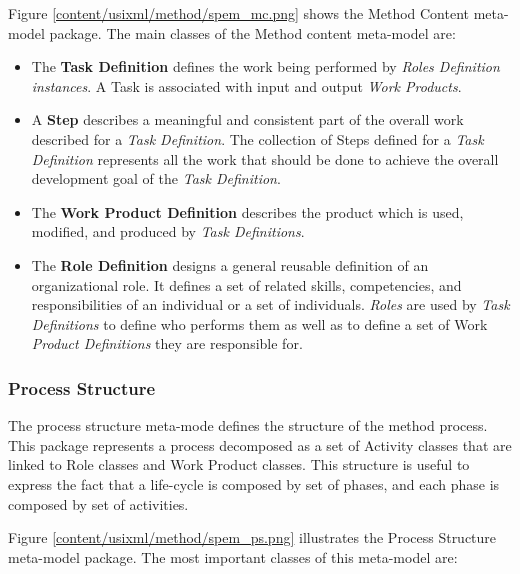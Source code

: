 Figure \ref{content/usixml/method/spem_mc.png} shows the Method Content meta-model package. The main classes of the Method content meta-model are:
\begin{itemize}
\item The \textbf{Task Definition} defines the work being performed by \textit{Roles Definition instances}. A Task is associated with input and output \textit{Work Products}.

\item A \textbf{Step} describes a meaningful and consistent part of the overall work described for
a \textit{Task Definition}. The collection of Steps defined for a \textit{Task Definition} represents all the work that should be done to achieve the overall development goal of the \textit{Task Definition}.

\item The \textbf{Work Product Definition} describes the product which is used, modified, and
produced by \textit{Task Definitions}.

\item The \textbf{Role Definition} designs a general reusable definition of an organizational role. It
defines a set of related skills, competencies, and responsibilities of an individual or a set of individuals. \textit{Roles} are used by \textit{Task Definitions} to define who performs them as well as to define a set of Work \textit{Product Definitions} they are responsible for.
\end{itemize}

\subsubsection{Process Structure}

The process structure meta-mode defines the structure of the method process. This package represents a process decomposed as a set of Activity classes that are linked to Role classes and Work Product classes. This structure is useful to express the fact that a life-cycle is composed by set of phases, and each phase is composed by set of activities.


Figure \ref{content/usixml/method/spem_ps.png} illustrates the Process Structure meta-model package. The most important classes of this meta-model are:


